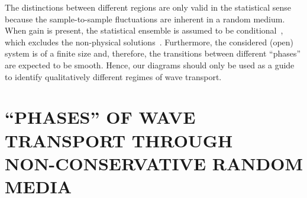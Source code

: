 \noindent The distinctions between different regions are only valid in the statistical sense because the sample-to-sample fluctuations are inherent in a random medium. When gain is present, the statistical ensemble is assumed to be conditional~\cite{2005_Yamilov_correlations}, which excludes the non-physical solutions~\cite{2002_Zhang_phys_solutions}. Furthermore, the considered (open) system is of a finite size and, therefore, the transitions between different ``phases'' are expected to be smooth. Hence, our diagrams should only be used as a guide to identify qualitatively different regimes of wave transport.

\section{``PHASES'' OF WAVE TRANSPORT THROUGH \\NON-CONSERVATIVE RANDOM MEDIA} 
\label{sec:phases}

